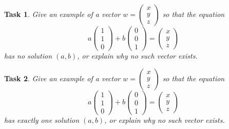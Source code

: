 \documentclass[10pt,]{book}
\theoremstyle{plain}
\numberwithin{equation}{section}
\newtheorem{task}{Task}[chapter]
\begin{document}
\begin{task}
\label{task-8}
Give an example of a vector \(w = \begin{pmatrix} x \\ y \\
                  z \end{pmatrix}\) so that the equation \[a \begin{pmatrix}
                  1 \\ 1 \\ 0 \end{pmatrix} + b \begin{pmatrix} 0 \\ 0 \\ 1
                  \end{pmatrix} = \begin{pmatrix} x \\ y \\ z \end{pmatrix}\]
                  has no solution \((a,b)\), or explain why no such vector
                  exists.%
\end{task}
\begin{task}
\label{task-9}
Give an example of a vector \(w = \begin{pmatrix} x \\ y \\ z
                  \end{pmatrix}\) so that the equation \[ a \begin{pmatrix}
                  1 \\ 1 \\ 0 \end{pmatrix} + b \begin{pmatrix} 0 \\ 0 \\ 1
                  \end{pmatrix} = \begin{pmatrix} x \\ y \\ z \end{pmatrix}\]
                  has exactly one solution \((a,b)\), or explain why no such
                  vector exists.%
\end{task}
\end{document}
